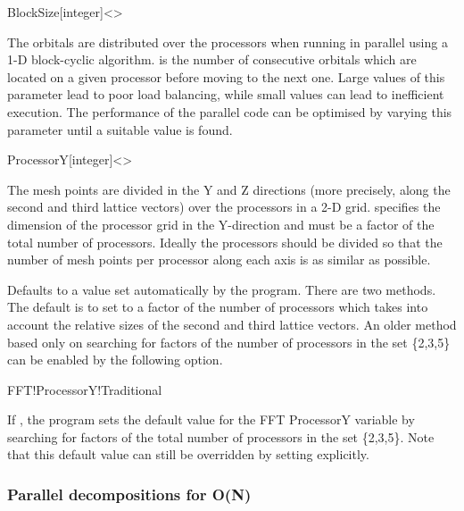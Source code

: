 
\begin{fdfentry}{BlockSize}[integer]<>

    The orbitals are distributed over the processors when running in
    parallel using a 1-D block-cyclic algorithm.  is
    the number of consecutive orbitals which are located on a given
    processor before moving to the next one. Large values of this
    parameter lead to poor load balancing, while small values can lead
    to inefficient execution. The performance of the parallel code can
    be optimised by varying this parameter until a suitable value is
    found.
  
  \end{fdfentry}
  
  \begin{fdfentry}{ProcessorY}[integer]<>
  
    The mesh points are divided in the Y and Z directions (more
    precisely, along the second and third lattice vectors) over the
    processors in a 2-D grid.  specifies the
    dimension of the processor grid in the Y-direction and must be a
    factor of the total number of processors. Ideally the processors
    should be divided so that the number of mesh points per processor
    along each axis is as similar as possible.
  
    Defaults to a value set automatically by the program. There are two
    methods. The default is to set  to a factor of the
    number of processors which takes into account the relative sizes of
    the second and third lattice vectors. An older method based only on
    searching for factors of the number of processors in the set
    \{2,3,5\} can be enabled by the following option.
  
  \end{fdfentry}
  
  \begin{fdflogicalF}{FFT!ProcessorY!Traditional}
  
    If \fdftrue, the program sets the default value for the FFT
    ProcessorY variable by searching for factors of the total number of
    processors in the set \{2,3,5\}. Note that this default value can
    still be overridden by setting  explicitly.
  
  \end{fdflogicalF}

  \subsubsection{Parallel decompositions for O(N)}
  \label{parallel-on}
  
